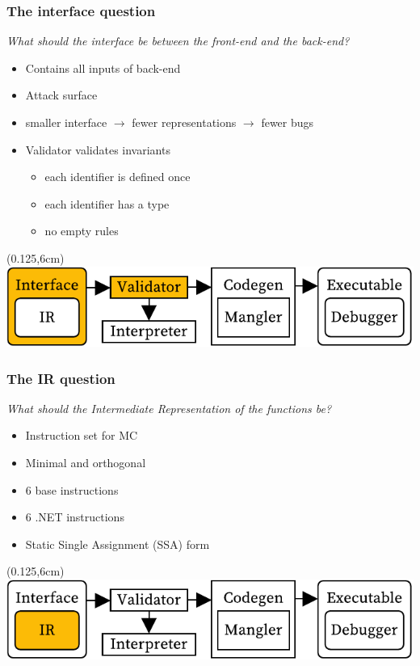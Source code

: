 \documentclass[xetex,serif,aspectratio=169]{beamer}
\begin{document}
\begin{frame}[t]
\end{frame}\begin{frame}[t]\frametitle{The interface question}
\textit{What should the interface be between the front-end and the back-end?}
\begin{itemize}
    \item Contains all inputs of back-end 
    \item Attack surface
    \item smaller interface $\longrightarrow$ fewer representations $\longrightarrow$ fewer bugs
    \item Validator validates invariants
    \begin{itemize}
        \item each identifier is defined once
        \item each identifier has a type
        \item no empty rules
    \end{itemize}
\end{itemize}
\begin{textblock*}{0.75\paperwidth}(0.125\paperwidth,6cm)\includegraphics[width=0.75\paperwidth]{overview_interface}\end{textblock*}

\end{frame}\begin{frame}[t]\frametitle{The IR question}
\textit{What should the Intermediate Representation of the functions be?}
\begin{itemize}
    \item Instruction set for MC
    \item Minimal and orthogonal
    \item 6 base instructions 
    \item 6 .NET instructions
    \item Static Single Assignment (SSA) form
\end{itemize}
\begin{textblock*}{0.75\paperwidth}(0.125\paperwidth,6cm)\includegraphics[width=0.75\paperwidth]{overview_ir}\end{textblock*}


\end{frame}
\end{document}
